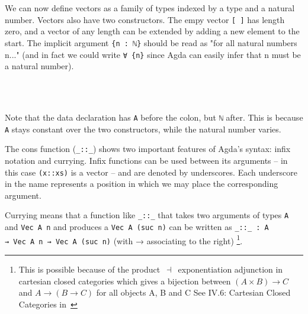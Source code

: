 We can now define vectors as a family of types indexed by a type and a natural number.
Vectors also have two constructors. The empy vector \texttt{[~]} has length zero, and a vector of any length can be extended by adding a new element to the start.
The implicit argument \texttt{\{n~:~ℕ\}} should be read as "for all natural numbers n..." (and in fact we could write \texttt{∀~\{n\}} since Agda can easily infer that n must be a natural number).
\begin{code}%
\>[0]\AgdaSpace{}%
\AgdaSpace{}%
\AgdaSymbol{(}\AgdaSpace{}%
\AgdaSymbol{:}\AgdaSpace{}%
\AgdaSymbol{)}\AgdaSpace{}%
\AgdaSymbol{:}\AgdaSpace{}%
\AgdaSpace{}%
\AgdaSpace{}%
\AgdaSpace{}%
\<%
\\
\>[0][@{}l@{\AgdaIndent{0}}]%
\>[2]\AgdaInductiveConstructor{[]}\AgdaSpace{}%
\AgdaSymbol{:}\AgdaSpace{}%
\AgdaSpace{}%
\AgdaSpace{}%
\<%
\\
%
\>[2]\AgdaOperator{\AgdaInductiveConstructor{\AgdaUnderscore{}::\AgdaUnderscore{}}}\AgdaSpace{}%
\AgdaSymbol{:}\AgdaSpace{}%
\AgdaSymbol{\{}\AgdaSpace{}%
\AgdaSymbol{:}\AgdaSpace{}%
\AgdaSymbol{\}}\AgdaSpace{}%
\AgdaSpace{}%
\AgdaSpace{}%
\AgdaSpace{}%
\AgdaSpace{}%
\AgdaSpace{}%
\AgdaSpace{}%
\AgdaSpace{}%
\AgdaSpace{}%
\AgdaSpace{}%
\AgdaSymbol{(}\AgdaSpace{}%
\AgdaSymbol{)}\<%
\end{code}
Note that the data declaration has \texttt{A} before the colon, but \texttt{ℕ} after.
This is because \texttt{A} stays constant over the two constructors, while the natural number varies.

The cons function (\texttt{\_::\_}) shows two important features of Agda's syntax: infix notation and currying.
Infix functions can be used between its arguments -- in this case \texttt{(x::xs)} is a vector --
and are denoted by underscores.
Each underscore in the name represents a position in which we may place the corresponding argument.

Currying means that a function like \texttt{\_::\_} that takes two arguments of types
\texttt{A} and \texttt{Vec~A~n} and produces a \texttt{Vec~A~(suc~n)} can be written as
\texttt{\_::\_~:~A →~Vec~A~n~→~Vec~A~(suc~n)} (with → associating to the right)
\footnote{This is possible because of the product~$\dashv$~exponentiation
adjunction in cartesian closed categories which gives a bijection
between $(A \times B) \rightarrow C$ and $A \rightarrow (B \rightarrow C)$ for all objects A, B and C
See IV.6: Cartesian Closed Categories in~\cite{maclane1998}}.

